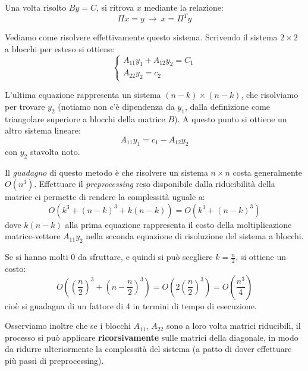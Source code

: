 \documentclass[a4paper,11pt]{article}
\begin{document}
Una volta risolto $By =C$, si ritrova $x$ mediante la relazione:
$$
\Pi x = y \ \rightarrow \ x = \Pi^T y
$$

Vediamo come risolvere effettivamente questo sistema.
Scrivendo il sistema $2 \times 2$ a blocchi per esteso si ottiene:
\[
	\begin{cases}
		A_{11} y_1 + A_{12} y_2 = C_1 \\
		A_{22} y_2 = c_2
	\end{cases}
\]

L'ultima equazione rappresenta un sistema $(n - k) \times (n - k)$, che risolviamo per trovare $y_2$ (notiamo non c'è dipendenza da $y_1$, dalla definizione come triangolare superiore a blocchi della matrice $B$).
A questo punto si ottiene un altro sistema lineare:
$$
A_{11} y_1 = c_1 - A_{12} y_2
$$
con $y_2$ stavolta noto.

Il \textit{guadagno} di questo metodo è che risolvere un sistema $n \times n$ costa generalmente $O(n^3)$.
Effettuare il \textit{preprocessing} reso disponibile dalla riducibilità della matrice ci permette di rendere la complessità uguale a:
$$
O(k^3 + (n - k)^3 + k(n - k)) = O(k^3 + (n - k)^3)
$$
dove $k(n - k)$ alla prima equazione rappresenta il costo della moltiplicazione matrice-vettore $A_{11} y_{2}$ nella seconda equazione di risoluzione del sistema a blocchi.

Se si hanno molti $0$ da sfruttare, e quindi si può scegliere $k = \frac{n}{2}$, si ottiene un costo:
$$
O\left(\left(\frac{n}{2}\right)^3 + \left( n - \frac{n}{2}\right)^3\right) = O\left(2 \left( \frac{n}{2} \right)^3\right) = O\left( \frac{n^3}{4} \right)
$$
cioè si guadagna di un fattore di 4 in termini di tempo di esecuzione.

Osserviamo inoltre che se i blocchi $A_{11}$, $A_{22}$ sono a loro volta matrici riducibili, il processo si può applicare \textbf{ricorsivamente} sulle matrici della diagonale, in modo da ridurre ulteriormente la complessità del sistema (a patto di dover effettuare più passi di preprocessing).
\end{document}
